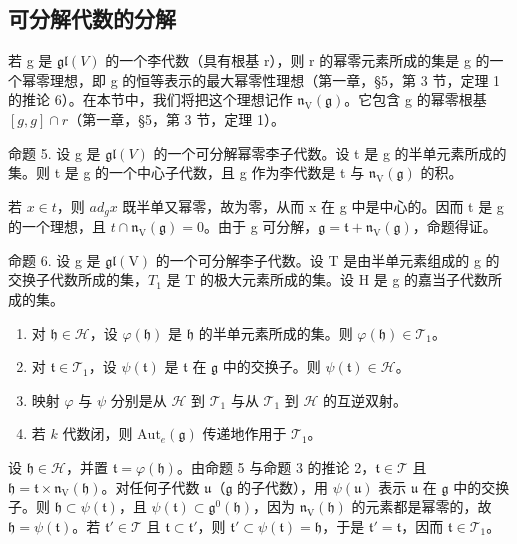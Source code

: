 \subsection{可分解代数的分解}

若 g 是 \(\mathfrak{gl}(V)\) 的一个李代数（具有根基 r），则 r 的幂零元素所成的集是 g 的一个幂零理想，即 g 的恒等表示的最大幂零性理想（第一章，§5，第 3 节，定理 1 的推论 6）。在本节中，我们将把这个理想记作 \(\mathfrak{n}_{\mathrm{V}}(\mathfrak{g})\)。它包含 g 的幂零根基 \([g,g]\cap r\)（第一章，§5，第 3 节，定理 1）。

命题 5. 设 g 是 \(\mathfrak{gl}(V)\) 的一个可分解幂零李子代数。设 t 是 g 的半单元素所成的集。则 t 是 g 的一个中心子代数，且 g 作为李代数是 t 与 \(\mathfrak{n}_{\mathrm{V}}(\mathfrak{g})\) 的积。

若 \(x \in t\)，则 \(ad_{g}x\) 既半单又幂零，故为零，从而 x 在 g 中是中心的。因而 t 是 g 的一个理想，且 \(t \cap \mathfrak{n}_{\mathrm{V}}(\mathfrak{g}) = 0\)。由于 g 可分解，\(\mathfrak{g} = \mathfrak{t} + \mathfrak{n}_{\mathrm{V}}(\mathfrak{g})\)，命题得证。

命题 6. 设 g 是 \(\mathfrak{gl}(\mathrm{V})\) 的一个可分解李子代数。设 T 是由半单元素组成的 g 的交换子代数所成的集，\(T_{1}\) 是 T 的极大元素所成的集。设 H 是 g 的嘉当子代数所成的集。

\begin{enumerate}
\def\labelenumi{(\roman{enumi})}
\item
  对 \(\mathfrak{h} \in \mathcal{H}\)，设 \(\varphi(\mathfrak{h})\) 是 \(\mathfrak{h}\) 的半单元素所成的集。则 \(\varphi(\mathfrak{h}) \in \mathcal{T}_1\)。
\item
  对 \(\mathfrak{t} \in \mathcal{T}_1\)，设 \(\psi(\mathfrak{t})\) 是 \(\mathfrak{t}\) 在 \(\mathfrak{g}\) 中的交换子。则 \(\psi(\mathfrak{t}) \in \mathscr{H}\)。
\item
  映射 \(\varphi\) 与 \(\psi\) 分别是从 \(\mathcal{H}\) 到 \(\mathcal{T}_1\) 与从 \(\mathcal{T}_1\) 到 \(\mathcal{H}\) 的互逆双射。
\item
  若 \(k\) 代数闭，则 \(\mathrm{Aut}_e(\mathfrak{g})\) 传递地作用于 \(\mathcal{T}_1\)。
\end{enumerate}

设 \(\mathfrak{h} \in \mathcal{H}\)，并置 \(\mathfrak{t} = \varphi(\mathfrak{h})\)。由命题 5 与命题 3 的推论 2，\(\mathfrak{t} \in \mathcal{T}\) 且 \(\mathfrak{h} = \mathfrak{t} \times \mathfrak{n}_{\mathrm{V}}(\mathfrak{h})\)。对任何子代数 \(\mathfrak{u}\)（\(\mathfrak{g}\) 的子代数），用 \(\psi(\mathfrak{u})\) 表示 \(\mathfrak{u}\) 在 \(\mathfrak{g}\) 中的交换子。则 \(\mathfrak{h} \subset \psi(\mathfrak{t})\)，且 \(\psi(\mathfrak{t}) \subset \mathfrak{g}^0(\mathfrak{h})\)，因为 \(\mathfrak{n}_{\mathrm{V}}(\mathfrak{h})\) 的元素都是幂零的，故 \(\mathfrak{h} = \psi(\mathfrak{t})\)。若 \(\mathfrak{t}' \in \mathcal{T}\) 且 \(\mathfrak{t} \subset \mathfrak{t}'\)，则 \(\mathfrak{t}' \subset \psi(\mathfrak{t}) = \mathfrak{h}\)，于是 \(\mathfrak{t}' = \mathfrak{t}\)，因而 \(\mathfrak{t} \in \mathcal{T}_1\)。

